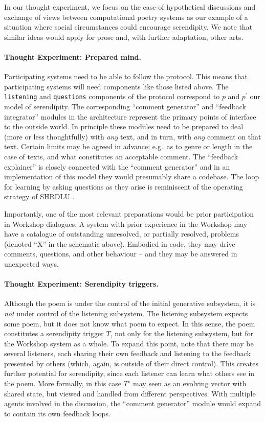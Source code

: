 In our thought experiment, we focus on the case of
hypothetical discussions and exchange of views between computational
poetry systems as our example of a situation where social
circumstances could encourage serendipity. We note that similar ideas
would apply for prose and, with further adaptation, other arts.

\paragraph{Thought Experiment: Prepared mind.}
Participating systems need to be able to follow the protocol.  This
means that participating systems will need components like those
listed above. The {\tt listening} and {\tt questions} components of
the protocol correspond to $p$ and $p^{\prime}$ our model of
serendipity.  The corresponding ``comment generator'' and ``feedback
integrator'' modules in the architecture represent the primary points
of interface to the outside world.  In principle these modules need to
be prepared to deal (more or less thoughtfully) with \emph{any} text,
and in turn, with \emph{any} comment on that text.  Certain limits may
be agreed in advance; e.g.~as to genre or length in the case of texts,
and what constitutes an acceptable comment.  The ``feedback
explainer'' is closely connected with the ``comment generator'' and in
an implementation of this model they would presumably share a
codebase.  The loop for learning by asking questions as they arise is
reminiscent of the operating strategy of {\sf SHRDLU}
\cite{winograd1972understanding}.

Importantly, one of the most relevant preparations would be prior
participation in Workshop dialogues.  A system with prior experience
in the Workshop may have a catalogue of outstanding unresolved, or
partially resolved, problems (denoted ``X'' in the schematic above).
Embodied in code, they may drive comments, questions, and other
behaviour -- and they may be answered in unexpected ways.

\paragraph{Thought Experiment: Serendipity triggers.}

Although the poem is under the control of the initial generative
subsystem, it is \emph{not} under control of the listening subsystem.
The listening subsystem expects some poem, but it does not know what
poem to expect.  In this sense, the poem constitutes a serendipity
trigger $T$, not only for the listening subsystem, but for the
Workshop system as a whole.
%
To expand this point, note that there may be several listeners, each
sharing their own feedback and listening to the feedback presented by
others (which, again, is outside of their direct control).  This
creates further potential for serendipity, since each listener can
learn what others see in the poem.  More formally, in this case
$T^\star$ may seen as an evolving vector with shared state, but viewed
and handled from different perspectives.  With multiple agents
involved in the discussion, the ``comment generator'' module would
expand to contain its own feedback loops.


